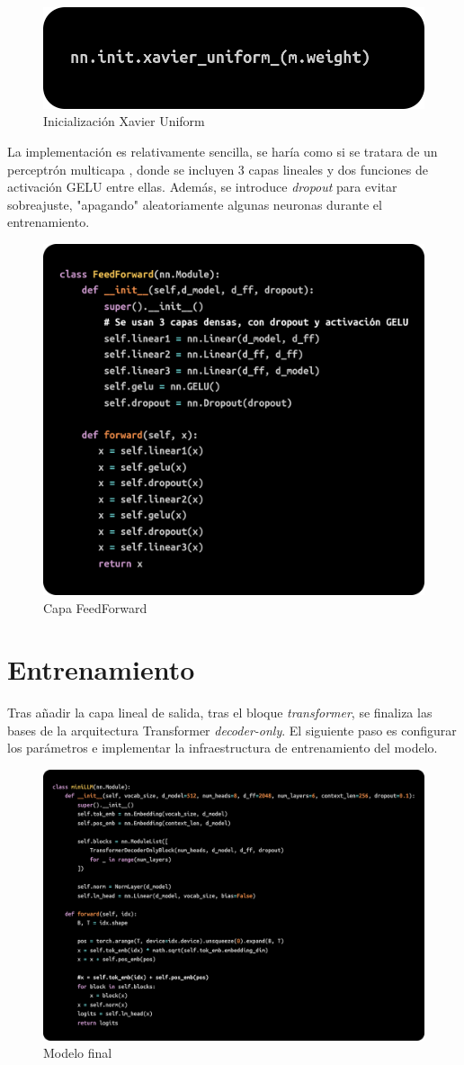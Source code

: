 \documentclass[11pt]{book}
\theoremstyle{plain}
\theoremstyle{definition}
\begin{document}
\begin{figure}[h]
    \centering
    \includegraphics[width=0.5\linewidth]{img/xavier_init.png}
    \caption{Inicialización Xavier Uniform}
    \label{fig:placeholder15}
\end{figure}

La implementación es relativamente sencilla, se haría como si se tratara de un perceptrón multicapa \parencite{kyeg_feedforward_demystified}, donde se incluyen 3 capas lineales y dos funciones de activación GELU entre ellas. Además, se introduce \textit{dropout} para evitar sobreajuste, "apagando" aleatoriamente algunas neuronas durante el entrenamiento.

\begin{figure}[h]
    \centering
    \includegraphics[width=0.5\linewidth]{img/ffnn.png}
    \caption{Capa FeedForward}
    \label{fig:placeholder16}
\end{figure}



\section{Entrenamiento}

Tras añadir la capa lineal de salida, tras el bloque \textit{transformer}, se finaliza las bases de la arquitectura Transformer \textit{decoder-only}. El siguiente paso es configurar los parámetros e implementar la infraestructura de entrenamiento del modelo. 

\begin{figure}[h]
    \centering
    \includegraphics[width=0.5\linewidth]{img/gpt2.png}
    \caption{Modelo final}
    \label{fig:placeholder19}
\end{figure}
\end{document}
